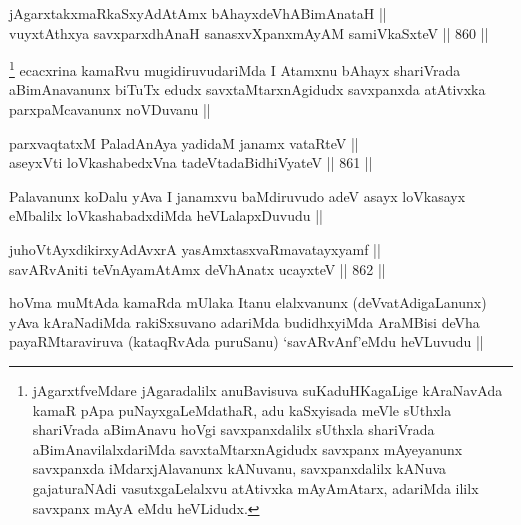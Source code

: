 
\begin{shl}
jAgarxtakxmaRkaSxyAdAtAmx bAhayxdeVhABimAnataH || \\
vuyxtAthxya savxparxdhAnaH sanasxvXpanxmAyAM samiVkaSxteV ||  860 || 
\end{shl}

\begin{artha}
\footnote{jAgarxtfveMdare jAgaradalilx anuBavisuva suKaduHKagaLige kAraNavAda kamaR pApa puNayxgaLeMdathaR, adu kaSxyisada meVle sUthxla shariVrada aBimAnavu hoVgi savxpanxdalilx sUthxla shariVrada aBimAnavilalxdariMda savxtaMtarxnAgidudx savxpanx mAyeyanunx savxpanxda iMdarxjAlavanunx kANuvanu, savxpanxdalilx kANuva gajaturaNAdi vasutxgaLelalxvu atAtivxka mAyAmAtarx, adariMda ililx savxpanx mAyA eMdu heVLidudx.}
ecacxrina kamaRvu mugidiruvudariMda I Atamxnu bAhayx shariVrada aBimAnavanunx biTuTx edudx savxtaMtarxnAgidudx savxpanxda atAtivxka parxpaMcavanunx noVDuvanu ||
\end{artha}


\begin{shl}
parxvaqtatxM PaladAnAya yadidaM janamx vataRteV || \\
aseyxVti loVkashabedxVna tadeVtadaBidhiVyateV ||  861 ||  
\end{shl}

\begin{artha}
Palavanunx koDalu yAva I janamxvu baMdiruvudo adeV asayx loVkasayx eMbalilx loVkashabadxdiMda heVLalapxDuvudu ||
\end{artha}


\begin{shl}
juhoVtAyxdikirxyAdAvxrA yasAmxtasxvaRmavatayxyamf || \\
savARvAniti teVnAyamAtAmx deVhAnatx ucayxteV ||  862 ||  
\end{shl}

\begin{artha}
hoVma muMtAda kamaRda mUlaka Itanu elalxvanunx (deVvatAdigaLanunx) yAva kAraNadiMda rakiSxsuvano adariMda budidhxyiMda AraMBisi deVha payaRMtaraviruva (kataqRvAda puruSanu) `savARvAnf'eMdu heVLuvudu ||
\end{artha}


